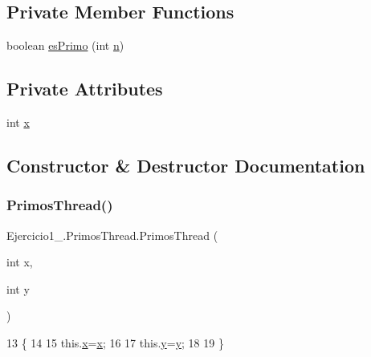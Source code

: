 \subsection*{Private Member Functions}
\begin{DoxyCompactItemize}
\item 
boolean \mbox{\hyperlink{class_ejercicio1__2_1_1_primos_thread_a2485938f2bd75c8f24b2e7156d50fa1b}{es\+Primo}} (int \mbox{\hyperlink{class_ejercicio1__2_1_1_primos_thread_a72bf483238391becf2581e3722acd93a}{n}})
\end{DoxyCompactItemize}
\subsection*{Private Attributes}
\begin{DoxyCompactItemize}
\item 
int \mbox{\hyperlink{class_ejercicio1__2_1_1_primos_thread_a872cf888fbe168d9ca57e2b9ca075b61}{x}}
\end{DoxyCompactItemize}


\subsection{Constructor \& Destructor Documentation}
\mbox{\label{class_ejercicio1__2_1_1_primos_thread_a9397e592ddc24ff533008df380619e20}} 
\subsubsection{\texorpdfstring{Primos\+Thread()}{PrimosThread()}}
{\footnotesize\ttfamily Ejercicio1\+\_.\+Primos\+Thread.\+Primos\+Thread (\begin{DoxyParamCaption}\item[{int}]{x,  }\item[{int}]{y }\end{DoxyParamCaption})\hspace{0.3cm}{\ttfamily [inline]}}


\begin{DoxyCode}
13                                      \{
14 
15         this.\mbox{\hyperlink{class_ejercicio1__2_1_1_primos_thread_a872cf888fbe168d9ca57e2b9ca075b61}{x}}=\mbox{\hyperlink{class_ejercicio1__2_1_1_primos_thread_a872cf888fbe168d9ca57e2b9ca075b61}{x}};
16 
17         this.\mbox{\hyperlink{class_ejercicio1__2_1_1_primos_thread_af052942d1162ca124373cee5f99c7dad}{y}}=\mbox{\hyperlink{class_ejercicio1__2_1_1_primos_thread_af052942d1162ca124373cee5f99c7dad}{y}};
18 
19     \}
\end{DoxyCode}


